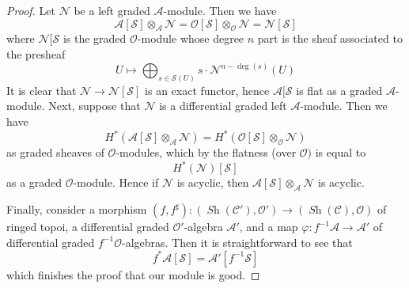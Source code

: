 \documentclass[10pt,a4paper]{amsart}
\theoremstyle{plain}
\theoremstyle{definition}
\theoremstyle{remark}
\numberwithin{equation}{subsection}
\def\Sh{\mathop{\mathit{Sh}}\nolimits}
\begin{document}
\begin{proof}
Let $\mathcal{N}$ be a left graded $\mathcal{A}$-module.
Then we have
$$
\mathcal{A}[\mathcal{S}] \otimes_\mathcal{A} \mathcal{N} =
\mathcal{O}[\mathcal{S}] \otimes_\mathcal{O} \mathcal{N} =
\mathcal{N}[\mathcal{S}]
$$
where $\mathcal{N}[\mathcal{S}$ is the
graded $\mathcal{O}$-module whose degree $n$ part
is the sheaf associated to the presheaf
$$
U \longmapsto
\bigoplus\nolimits_{s \in \mathcal{S}(U)} s \cdot \mathcal{N}^{n - \deg(s)}(U)
$$
It is clear that $\mathcal{N} \to \mathcal{N}[\mathcal{S}]$
is an exact functor, hence $\mathcal{A}[\mathcal{S}$ is flat
as a graded $\mathcal{A}$-module. Next, suppose that $\mathcal{N}$
is a differential graded left $\mathcal{A}$-module. Then we have
$$
H^*(\mathcal{A}[\mathcal{S}] \otimes_\mathcal{A} \mathcal{N}) =
H^*(\mathcal{O}[\mathcal{S}] \otimes_\mathcal{O} \mathcal{N})
$$
as graded sheaves of $\mathcal{O}$-modules, which by the flatness
(over $\mathcal{O})$ is equal to
$$
H^*(\mathcal{N})[\mathcal{S}]
$$
as a graded $\mathcal{O}$-module. Hence if $\mathcal{N}$ is acyclic,
then $\mathcal{A}[\mathcal{S}] \otimes_\mathcal{A} \mathcal{N}$
is acyclic.

\medskip\noindent
Finally, consider a morphism
$(f, f^\sharp) : (\Sh(\mathcal{C}'), \mathcal{O}')
\to (\Sh(\mathcal{C}), \mathcal{O})$
of ringed topoi, a differential graded $\mathcal{O}'$-algebra
$\mathcal{A}'$, and a map $\varphi : f^{-1}\mathcal{A} \to \mathcal{A}'$
of differential graded $f^{-1}\mathcal{O}$-algebras.
Then it is straightforward to see that
$$
f^*\mathcal{A}[\mathcal{S}] = \mathcal{A}'[f^{-1}\mathcal{S}]
$$
which finishes the proof that our module is good.
\end{proof}
\end{document}
